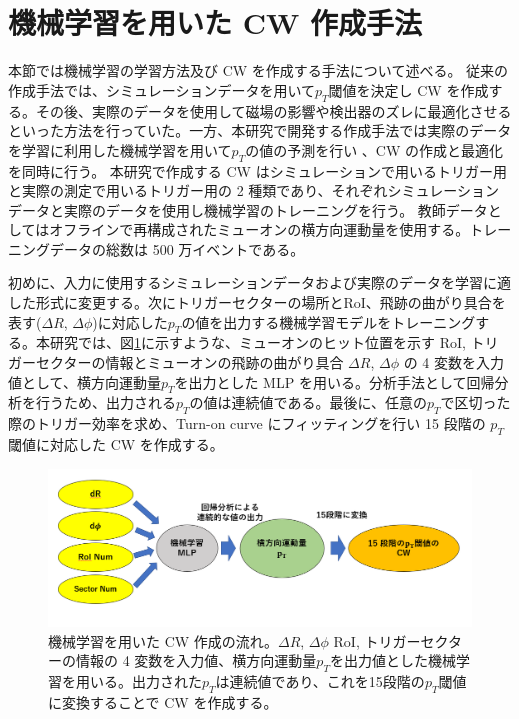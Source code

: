 \section{機械学習を用いた CW 作成手法}
本節では機械学習の学習方法及び CW を作成する手法について述べる。
従来の作成手法では、シミュレーションデータを用いて$p_T$閾値を決定し CW を作成する。その後、実際のデータを使用して磁場の影響や検出器のズレに最適化させるといった方法を行っていた。一方、本研究で開発する作成手法では実際のデータを学習に利用した機械学習を用いて$p_T$の値の予測を行い 、CW の作成と最適化を同時に行う。
本研究で作成する CW はシミュレーションで用いるトリガー用と実際の測定で用いるトリガー用の 2 種類であり、それぞれシミュレーションデータと実際のデータを使用し機械学習のトレーニングを行う。
教師データとしてはオフラインで再構成されたミューオンの横方向運動量を使用する。トレーニングデータの総数は 500 万イベントである。

初めに、入力に使用するシミュレーションデータおよび実際のデータを学習に適した形式に変更する。次にトリガーセクターの場所とRoI、飛跡の曲がり具合を表す($\Delta R$, $\Delta \phi$)に対応した$p_T$の値を出力する機械学習モデルをトレーニングする。本研究では、図\ref{fig:MLP_over}に示すような、ミューオンのヒット位置を示す RoI, トリガーセクターの情報とミューオンの飛跡の曲がり具合 $\Delta R$, $\Delta \phi$ の 4 変数を入力値として、横方向運動量$p_T$を出力とした MLP を用いる。分析手法として回帰分析を行うため、出力される$p_T$の値は連続値である。最後に、任意の$p_T$で区切った際のトリガー効率を求め、Turn-on curve にフィッティングを行い 15 段階の $p_T$ 閾値に対応した CW を作成する。

\begin{figure}[tb]
  \centering
  \includegraphics[clip, width=15cm]{fig/4/MLPoverview.png}
  \caption{機械学習を用いた CW 作成の流れ。$\Delta R$, $\Delta \phi$ RoI, トリガーセクターの情報の 4 変数を入力値、横方向運動量$p_T$を出力値とした機械学習を用いる。出力された$p_T$は連続値であり、これを15段階の$p_T$閾値に変換することで CW を作成する。}
  \label{fig:MLP_over}
\end{figure}

